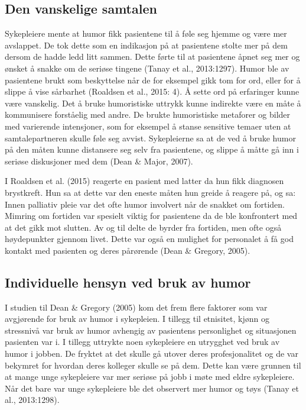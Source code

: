 \subsection{Den vanskelige samtalen}

Sykepleiere mente at humor fikk pasientene til å føle seg hjemme og være mer
avslappet. De tok dette som en indikasjon på at pasientene stolte mer på dem
dersom de hadde ledd litt sammen. Dette førte til at pasientene åpnet seg mer
og ønsket å snakke om de seriøse tingene (Tanay et al., 2013:1297).  Humor ble
av pasientene brukt som beskyttelse når de for eksempel gikk tom for ord, eller
for å slippe å vise sårbarhet (Roaldsen et al., 2015: 4). Å sette ord på
erfaringer kunne være vanskelig. Det å bruke humoristiske uttrykk kunne
indirekte være en måte å kommunisere forståelig med andre. De brukte
humoristiske metaforer og bilder med varierende intensjoner, som for eksempel å
stanse sensitive temaer uten at samtalepartneren skulle føle seg avvist.
Sykepleierne sa at de ved å bruke humor på den måten kunne distansere seg selv
fra pasientene, og slippe å måtte gå inn i seriøse diskusjoner med dem (Dean \&
Major, 2007).

I Roaldsen et al. (2015) reagerte en pasient med latter da hun fikk diagnosen
brystkreft. Hun sa at dette var den eneste måten hun greide å reagere på, og
sa:  Innen
palliativ pleie var det ofte humor involvert når de snakket om fortiden.
Mimring om fortiden var spesielt viktig for pasientene da de ble konfrontert
med at det gikk mot slutten. Av og til delte de byrder fra fortiden, men ofte
også høydepunkter gjennom livet. Dette var også en mulighet for personalet å få
god kontakt med pasienten og deres pårørende (Dean \&{} Gregory, 2005).

\subsection{Individuelle hensyn ved bruk av humor}

I studien til Dean \&{} Gregory (2005) kom det frem flere faktorer som var
avgjørende for bruk av humor i sykepleien. I tillegg til etnisitet, kjønn og
stressnivå  var bruk av humor avhengig av pasientens personlighet og
situasjonen pasienten var i. I tillegg uttrykte noen sykepleiere en utrygghet
ved bruk av humor i jobben. De fryktet at det skulle gå utover deres
profesjonalitet og de var bekymret for hvordan deres kolleger skulle se på dem.
Dette kan være grunnen til at mange unge sykepleiere var mer seriøse på jobb i
møte med eldre sykepleiere. Når det bare var unge sykepleiere ble det observert
mer humor og tøys (Tanay et al., 2013:1298).

